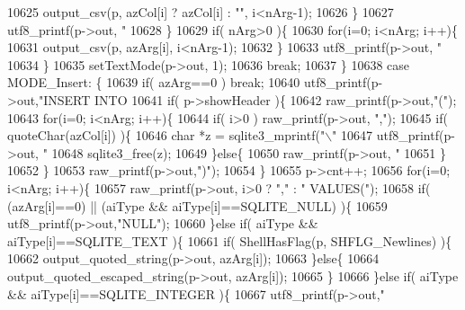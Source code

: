 \begin{DoxyCode}
{{{{{{{{{{{{{{{{{{10625           output_csv(p, azCol[i] ? azCol[i] : \textcolor{stringliteral}{""}, i<nArg-1);
10626         \}
10627         utf8_printf(p->out, \textcolor{stringliteral}{"%
10628       \}
10629       \textcolor{keywordflow}{if}( nArg>0 )\{
10630         \textcolor{keywordflow}{for}(i=0; i<nArg; i++)\{
10631           output_csv(p, azArg[i], i<nArg-1);
10632         \}
10633         utf8_printf(p->out, \textcolor{stringliteral}{"%
10634       \}
10635       setTextMode(p->out, 1);
10636       \textcolor{keywordflow}{break};
10637     \}
10638     \textcolor{keywordflow}{case} MODE_Insert: \{
10639       \textcolor{keywordflow}{if}( azArg==0 ) \textcolor{keywordflow}{break};
10640       utf8_printf(p->out,\textcolor{stringliteral}{"INSERT INTO %
10641       \textcolor{keywordflow}{if}( p->showHeader )\{
10642         raw_printf(p->out,\textcolor{stringliteral}{"("});
10643         \textcolor{keywordflow}{for}(i=0; i<nArg; i++)\{
10644           \textcolor{keywordflow}{if}( i>0 ) raw_printf(p->out, \textcolor{stringliteral}{","});
10645           \textcolor{keywordflow}{if}( quoteChar(azCol[i]) )\{
10646             \textcolor{keywordtype}{char} *z = sqlite3_mprintf(\textcolor{stringliteral}{"\(\backslash\)"%
10647             utf8_printf(p->out, \textcolor{stringliteral}{"%
10648             sqlite3_free(z);
10649           \}\textcolor{keywordflow}{else}\{
10650             raw_printf(p->out, \textcolor{stringliteral}{"%
10651           \}
10652         \}
10653         raw_printf(p->out,\textcolor{stringliteral}{")"});
10654       \}
10655       p->cnt++;
10656       \textcolor{keywordflow}{for}(i=0; i<nArg; i++)\{
10657         raw_printf(p->out, i>0 ? \textcolor{stringliteral}{","} : \textcolor{stringliteral}{" VALUES("});
10658         \textcolor{keywordflow}{if}( (azArg[i]==0) || (aiType && aiType[i]==SQLITE_NULL) )\{
10659           utf8_printf(p->out,\textcolor{stringliteral}{"NULL"});
10660         \}\textcolor{keywordflow}{else} \textcolor{keywordflow}{if}( aiType && aiType[i]==SQLITE_TEXT )\{
10661           \textcolor{keywordflow}{if}( ShellHasFlag(p, SHFLG_Newlines) )\{
10662             output_quoted_string(p->out, azArg[i]);
10663           \}\textcolor{keywordflow}{else}\{
10664             output_quoted_escaped_string(p->out, azArg[i]);
10665           \}
10666         \}\textcolor{keywordflow}{else} \textcolor{keywordflow}{if}( aiType && aiType[i]==SQLITE_INTEGER )\{
10667           utf8_printf(p->out,\textcolor{stringliteral}{"%
}}}}}}}}}}}}}}}}}}}}}}}}}
\end{DoxyCode}

